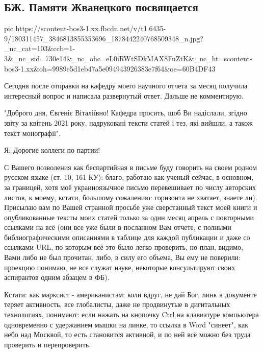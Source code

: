  
 
 
 
 

\subsection{БЖ. Памяти Жванецкого посвящается}


\ifcmt
  pic https://scontent-bos3-1.xx.fbcdn.net/v/t1.6435-9/180311457_3846813855353696_1878442240768509348_n.jpg?_nc_cat=103&ccb=1-3&_nc_sid=730e14&_nc_ohc=eL0iRWtSDkMAX8FuZtK&_nc_ht=scontent-bos3-1.xx&oh=9989e5d1eb47a5e094943926383e7f64&oe=60B4DF43
\fi


Сегодня после отправки на кафедру моего научного отчета за месяц получила
интересный вопрос и написала развернутый ответ. Дальше не комментирую. 

"Доброго дня, Євгеніє Віталіївно! Кафедра просить, щоб Ви надіслали, згідно
звіту за квітень 2021 року, надруковані тексти статей і тез, які вийшли, а
також текст монографії".

Я: Дорогие коллеги по партии! 

С Вашего позволения как беспартийная в письме буду говорить на своем родном
русском языке (ст. 10, 161 КУ): благо, работаю как ученый сейчас, в основном,
за границей, хотя моё украиноязычное письмо перевешивает по числу авторских
листов, к моему, кстати, большому сожалению: горизонта не хватает, знаете ли).
Присылаю вам по Вашей странной просьбе уже сверстанный текст моей книги и
опубликованные тексты моих статей только за один месяц апрель с повторными
ссылками на всё (они все уже были в посланном Вам отчете, с полными
библиографическими описаниями в таблице для каждой публикации и даже со
ссылками URL, по которым всё это было легко проверить, но план, видимо, Вами
либо не был прочитан, либо, в силу его объема, Вы ему не поверили: проекцию
понимаю, не все служат науке, некоторые консультируют своих аспирантов одним
абзацем в ФБ).  

Кстати: как марксист - американистам: коли вдруг, не дай Бог, линк в документе
теряет активность, все глобалисты, даже не продвинутые в дигитальных
технологиях, понимают: если нажать на кнопочку Ctrl  на клавиатуре компьютера
одновременно с удержанием мышки на линке, то ссылка в Word "синеет", как небо
над Москвой, то есть становится активной, и по ней всё можно без труда
проверить и перепроверить. 

